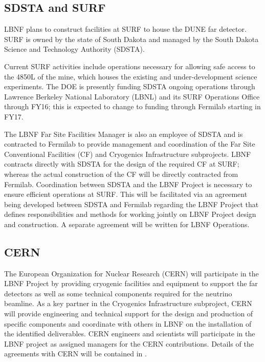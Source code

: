 \subsection{SDSTA and SURF}

LBNF plans to construct facilities at SURF to house the DUNE far detector. SURF is owned by the state of South Dakota and managed by the South Dakota Science and Technology Authority (SDSTA). 

Current SURF activities include operations necessary for allowing safe access to the 4850L of the mine, which houses the existing and under-development science experiments. The DOE is presently funding SDSTA ongoing operations through Lawrence Berkeley National Laboratory (LBNL) and its SURF Operations Office through FY16; this is expected to change to funding through Fermilab starting in FY17. 

The LBNF Far Site Facilities Manager is also an employee of SDSTA and is contracted to Fermilab to provide management and coordination of the Far Site Conventional Facilities (CF) and Cryogenics Infrastructure subprojects. LBNF contracts directly with SDSTA for the design of the required CF at SURF; whereas the actual construction of the CF will be directly contracted from Fermilab. Coordination between SDSTA and the LBNF Project is necessary to ensure efficient operations at SURF. This will be facilitated via an agreement being developed between SDSTA and Fermilab regarding the LBNF Project  that defines responsibilities and methods for working jointly on LBNF Project design and construction. A separate agreement will be written for LBNF Operations. 

\subsection{CERN}

The European Organization for Nuclear Research (CERN) will participate in the LBNF Project by providing cryogenic facilities and equipment to support the far detectors as well as some technical components required for the neutrino beamline. As a key partner in the Cryogenics Infrastructure subproject, CERN will provide engineering and technical support for the design and production of specific components and coordinate with others in LBNF on the installation of the identified deliverables. CERN engineers and scientists will participate in the LBNF project as assigned managers for the CERN contributions.
Details of the agreements with CERN will be contained in .  

